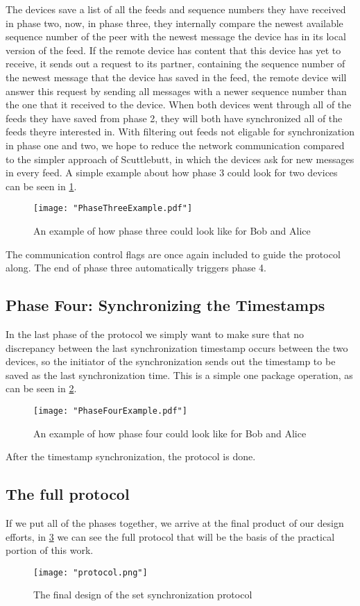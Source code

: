 The devices save a list of all the feeds and sequence numbers they have received in phase two, now, in phase three, they internally compare the newest available sequence number of the peer with the newest message the device has in its local version of the feed. If the remote device has content that this device has yet to receive, it sends out a request to its partner, containing the sequence number of the newest message that the device has saved in the feed, the remote device will answer this request by sending all messages with a newer sequence number than the one that it received to the device. When both devices went through all of the feeds they have saved from phase 2, they will both have synchronized all of the feeds theyre interested in. With filtering out feeds not eligable for synchronization in phase one and two, we hope to reduce the network communication compared to the simpler approach of Scuttlebutt, in which the devices ask for new messages in every feed. A simple example about how phase 3 could look for two devices can be seen in \ref{fig:PhaseThreeExample}.

\begin{figure}[!h]
	\centering
	\texttt{[image: "PhaseThreeExample.pdf"]}
	\caption{An example of how phase three could look like for Bob and Alice}
	\label{fig:PhaseThreeExample}
\end{figure}

The communication control flags are once again included to guide the protocol along. The end of phase three automatically triggers phase 4.

\subsection{Phase Four: Synchronizing the Timestamps}

In the last phase of the protocol we simply want to make sure that no discrepancy between the last synchronization timestamp occurs between the two devices, so the initiator of the synchronization sends out the timestamp to be saved as the last synchronization time. This is a simple one package operation, as can be seen in \ref{fig:PhaseFourExample}.

\begin{figure}[!h]
	\centering
	\texttt{[image: "PhaseFourExample.pdf"]}
	\caption{An example of how phase four could look like for Bob and Alice}
	\label{fig:PhaseFourExample}
\end{figure}

After the timestamp synchronization, the protocol is done.
\clearpage
\subsection{The full protocol}

If we put all of the phases together, we arrive at the final product of our design efforts, in \ref{fig:protocol} we can see the full protocol that will be the basis of the practical portion of this work.


\begin{figure}[h!]
	\centering
	\texttt{[image: "protocol.png"]}
	\caption{The final design of the set synchronization protocol}
	\label{fig:protocol}
\end{figure}
